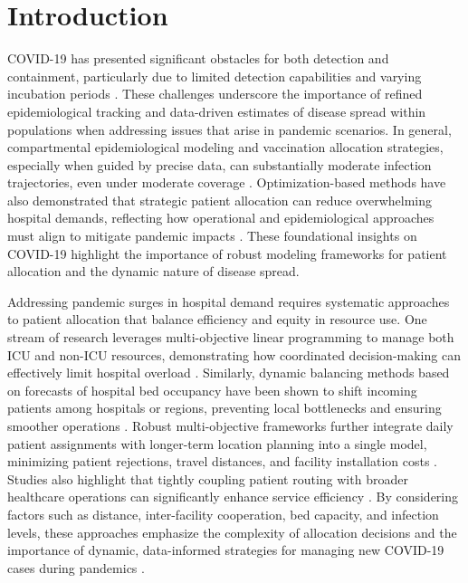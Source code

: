 \documentclass{article}
\begin{document}
\section{Introduction}
COVID-19 has presented significant obstacles for both detection and containment, particularly due to limited detection capabilities and varying incubation periods \parencite{li2020modeling, lauer2020incubation, meyerowitz2020systematic}. These challenges underscore the importance of refined epidemiological tracking and data-driven estimates of disease spread within populations when addressing issues that arise in pandemic scenarios. In general, compartmental epidemiological modeling and vaccination allocation strategies, especially when guided by precise data, can substantially moderate infection trajectories, even under moderate coverage \parencite{waseel2024assessing}. Optimization-based methods have also demonstrated that strategic patient allocation can reduce overwhelming hospital demands, reflecting how operational and epidemiological approaches must align to mitigate pandemic impacts \parencite{sarkar2021covid}. These foundational insights on COVID-19 highlight the importance of robust modeling frameworks for patient allocation and the dynamic nature of disease spread.

Addressing pandemic surges in hospital demand requires systematic approaches to patient allocation that balance efficiency and equity in resource use. One stream of research leverages multi-objective linear programming to manage both ICU and non-ICU resources, demonstrating how coordinated decision-making can effectively limit hospital overload \parencite{aydin2022analyses}. Similarly, dynamic balancing methods based on forecasts of hospital bed occupancy have been shown to shift incoming patients among hospitals or regions, preventing local bottlenecks and ensuring smoother operations \parencite{dijkstra2023dynamic}. Robust multi-objective frameworks further integrate daily patient assignments with longer-term location planning into a single model, minimizing patient rejections, travel distances, and facility installation costs \parencite{eriskin2024robust}. Studies also highlight that tightly coupling patient routing with broader healthcare operations can significantly enhance service efficiency \parencite{yinusa2023optimizing, shi2023data}. By considering factors such as distance, inter-facility cooperation, bed capacity, and infection levels, these approaches emphasize the complexity of allocation decisions and the importance of dynamic, data-informed strategies for managing new COVID-19 cases during pandemics \parencite{sarkar2021covid}.
\end{document}
